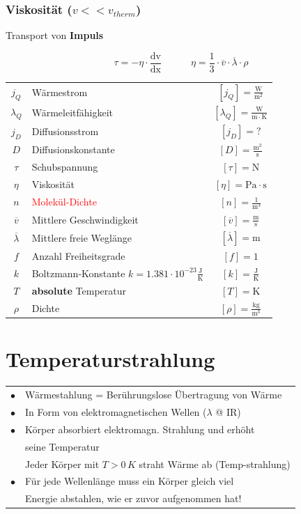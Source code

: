 \subsubsection{Viskosität ($v << v_{therm}$)}
Transport von \textbf{Impuls} 


$$ \boxed{ \tau = - \eta \cdot \frac{\mathrm{dv}}{\mathrm{dx}} \qquad \quad  \eta = \frac{1}{3} \cdot \overline{v} \cdot \overline{\lambda} \cdot \rho }  $$


\begin{tabular}{c l c}
	\rule{0pt}{10pt}$j_Q$ & Wärmestrom & $[j_Q] = \mathrm{\frac{W}{m^2}}$ \\
	\rule{0pt}{10pt}$\lambda_Q$ & Wärmeleitfähigkeit & $[\lambda_Q] = \mathrm{\frac{W}{m \cdot K}}$ \\
	$j_D$ & Diffusionsstrom & $[j_D] = ?$ \\
	\rule{0pt}{10pt}$D$ & Diffusionskonstante & $[D] = \mathrm{\frac{m^2}{s}}$ \\
	$\tau$ & Schubspannung & $[\tau] = \mathrm{N}$ \\
	$\eta$ & Viskosität & $[\eta] = \mathrm{Pa \cdot s}$ \\
	\rule{0pt}{10pt}$n$ & \textcolor{red}{Molekül-Dichte} & $[n] = \mathrm{\frac{1}{m^3}}$\\	
	\rule{0pt}{10pt}$\overline{v}$ & Mittlere Geschwindigkeit & $[\overline{v}] = \mathrm{\frac{m}{s}}$ \\
	\rule{0pt}{10pt}$\overline{\lambda}$ & Mittlere freie Weglänge & $[\overline{\lambda}] = \mathrm{m}$ \\
	$f$ & Anzahl Freiheitsgrade & $[f] = \mathrm{1}$ \\
	\rule{0pt}{10pt}$k$ & Boltzmann-Konstante $k = 1.381 \cdot 10^{-23} \mathrm{\frac{J}{K}}$ & $[k] = \mathrm{\frac{J}{K}}$ \\
	$T$ & \textbf{absolute} Temperatur & $[T] = \mathrm{K}$ \\
	\rule{0pt}{10pt}$\rho$ & Dichte & $[\rho] = \mathrm{\frac{kg}{m^3}}$ \\
\end{tabular}


\section{Temperaturstrahlung}

\begin{tabular}{ll}
$\bullet$ & Wärmestahlung = Berührungslose Übertragung von Wärme \\
$\bullet$ & In Form von elektromagnetischen Wellen ($\lambda$ @ IR) \\
$\bullet$ & Körper absorbiert elektromagn. Strahlung und erhöht \\
		  & seine Temperatur \\ 
          & Jeder Körper mit $T > 0 \, K$ straht Wärme ab (Temp-strahlung) \\
$\bullet$ & Für jede Wellenlänge muss ein Körper gleich viel  \\
		  & Energie abstahlen, wie er zuvor aufgenommen hat!\\
\end{tabular}




